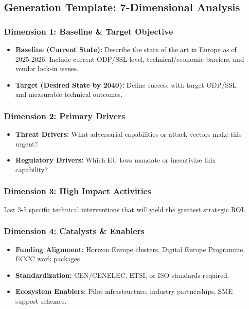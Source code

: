 \documentclass[12pt,a4paper]{report}
\begin{document}
\subsection*{Generation Template: 7-Dimensional Analysis}

\subsubsection*{Dimension 1: Baseline \& Target Objective}
\begin{itemize}
    \item \textbf{Baseline (Current State):} Describe the state of the art in Europe as of 2025-2026. Include current ODP/SSL level, technical/economic barriers, and vendor lock-in issues.
    \item \textbf{Target (Desired State by 2040):} Define success with target ODP/SSL and measurable technical outcomes.
\end{itemize}

\subsubsection*{Dimension 2: Primary Drivers}
\begin{itemize}
    \item \textbf{Threat Drivers:} What adversarial capabilities or attack vectors make this urgent?
    \item \textbf{Regulatory Drivers:} Which EU laws mandate or incentivize this capability?
\end{itemize}

\subsubsection*{Dimension 3: High Impact Activities}
List 3-5 specific technical interventions that will yield the greatest strategic ROI.

\subsubsection*{Dimension 4: Catalysts \& Enablers}
\begin{itemize}
    \item \textbf{Funding Alignment:} Horizon Europe clusters, Digital Europe Programme, ECCC work packages.
    \item \textbf{Standardization:} CEN/CENELEC, ETSI, or ISO standards required.
    \item \textbf{Ecosystem Enablers:} Pilot infrastructure, industry partnerships, SME support schemes.
\end{itemize}
\end{document}
